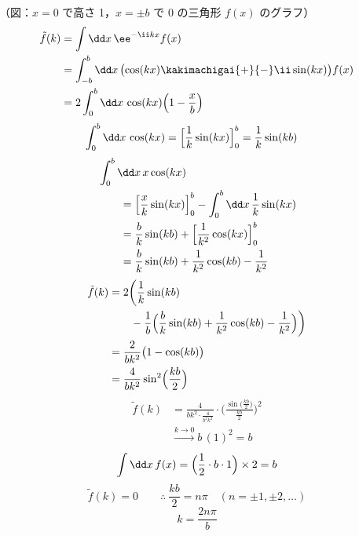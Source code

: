 （図：$x=0$ で高さ 1，$x=\pm b$ で 0 の三角形 $f(x)$ のグラフ）
\begin{align*}
  \tilde f(k)&=\int\dd x\,\ee^{-\ii kx}f(x)\\
  &=\int_{-b}^{b}\dd x\,\bigl(\cos(kx)\kakimachigai{+}{-}\ii\sin(kx)\bigr)f(x)\\
  &=2\int_{0}^{b}\dd x\,\cos(kx)\Bigl(1-\frac{x}{b}\Bigr)
\end{align*}
\begin{align*}
  \int_{0}^{b}\dd x\,\cos(kx)&=\Bigl[\frac{1}{k}\sin(kx)\Bigr]_{0}^{b}=\frac{1}{k}\sin(kb)
\end{align*}
\begin{align*}
  &\int_{0}^{b}\dd x\,x\cos(kx)\\
  &\qquad=\Bigl[\frac{x}{k}\sin(kx)\Bigr]_{0}^{b}-\int_{0}^{b}\dd x\,\frac{1}{k}\sin(kx)\\
  &\qquad=\frac{b}{k}\sin(kb)+\Bigl[\frac{1}{k^{2}}\cos(kx)\Bigr]_{0}^{b}\\
  &\qquad=\frac{b}{k}\sin(kb)+\frac{1}{k^{2}}\cos(kb)-\frac{1}{k^{2}}
\end{align*}
\begin{align*}
  \tilde f(k)&=2\biggl(\frac{1}{k}\sin(kb)\\
  &\qquad-\frac{1}{b}\Bigl(\frac{b}{k}\sin(kb)+\frac{1}{k^{2}}\cos(kb)-\frac{1}{k^{2}}\Bigr)\biggr)\\
  &=\frac{2}{bk^{2}}\bigl(1-\cos(kb)\bigr)\\
  &=\frac{4}{bk^{2}}\sin^{2}\Bigl(\frac{kb}{2}\Bigr)
\end{align*}
\begin{align*}
  \tilde f(k)&=\frac{4}{bk^{2}\cdot\frac{4}{b^{2}k^{2}}}\cdot\Biggl(\frac{\sin\bigl(\frac{kb}{2}\bigr)}{\frac{kb}{2}}\Biggr)^{2}\\
  &\xrightarrow{k\to0}b\,(1)^{2}=b
\end{align*}
\[ \int\dd x\,f(x)=\Bigl(\frac{1}{2}\cdot b\cdot1\Bigr)\times2=b \]
\[ \tilde f(k)=0\qquad\therefore\ \frac{kb}{2}=n\pi\quad(n=\pm1,\pm2,\dots) \]
\[ k=\frac{2n\pi}{b} \]
